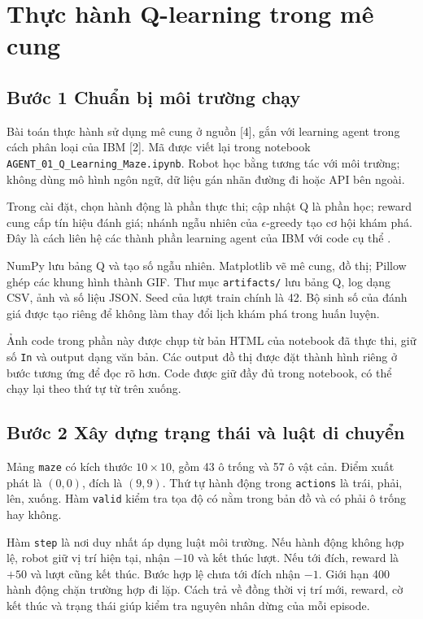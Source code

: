 \chapter{Thực hành Q-learning trong mê cung}
\label{chap:practice}
\section{Bước 1 Chuẩn bị môi trường chạy}
Bài toán thực hành sử dụng mê cung ở nguồn [4], gắn với learning agent trong cách phân loại của IBM [2]. Mã được viết lại trong notebook \texttt{AGENT\_01\_Q\_Learning\_Maze.ipynb}. Robot học bằng tương tác với môi trường; không dùng mô hình ngôn ngữ, dữ liệu gán nhãn đường đi hoặc API bên ngoài.

Trong cài đặt, chọn hành động là phần thực thi; cập nhật Q là phần học; reward cung cấp tín hiệu đánh giá; nhánh ngẫu nhiên của $\epsilon$-greedy tạo cơ hội khám phá. Đây là cách liên hệ các thành phần learning agent của IBM với code cụ thể \cite{ibm}.

NumPy lưu bảng Q và tạo số ngẫu nhiên. Matplotlib vẽ mê cung, đồ thị; Pillow ghép các khung hình thành GIF. Thư mục \texttt{artifacts/} lưu bảng Q, log dạng CSV, ảnh và số liệu JSON. Seed của lượt train chính là 42. Bộ sinh số của đánh giá được tạo riêng để không làm thay đổi lịch khám phá trong huấn luyện.


Ảnh code trong phần này được chụp từ bản HTML của notebook đã thực thi, giữ số \texttt{In} và output dạng văn bản. Các output đồ thị được đặt thành hình riêng ở bước tương ứng để đọc rõ hơn. Code được giữ đầy đủ trong notebook, có thể chạy lại theo thứ tự từ trên xuống.

\clearpage
\section{Bước 2 Xây dựng trạng thái và luật di chuyển}
Mảng \texttt{maze} có kích thước $10\times10$, gồm 43 ô trống và 57 ô vật cản. Điểm xuất phát là $(0,0)$, đích là $(9,9)$. Thứ tự hành động trong \texttt{actions} là trái, phải, lên, xuống. Hàm \texttt{valid} kiểm tra tọa độ có nằm trong bản đồ và có phải ô trống hay không.


Hàm \texttt{step} là nơi duy nhất áp dụng luật môi trường. Nếu hành động không hợp lệ, robot giữ vị trí hiện tại, nhận $-10$ và kết thúc lượt. Nếu tới đích, reward là $+50$ và lượt cũng kết thúc. Bước hợp lệ chưa tới đích nhận $-1$. Giới hạn 400 hành động chặn trường hợp đi lặp. Cách trả về đồng thời vị trí mới, reward, cờ kết thúc và trạng thái giúp kiểm tra nguyên nhân dừng của mỗi episode.

